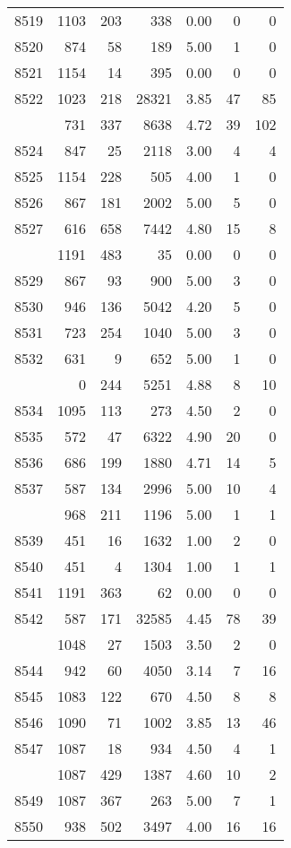 \documentclass[
]{article}
\begin{document}
\begin{table}
\begin{tabular}[t]{lrrrrrr}
8519 & 1103 & 203 & 338 & 0.00 & 0 & 0\\
8520 & 874 & 58 & 189 & 5.00 & 1 & 0\\
8521 & 1154 & 14 & 395 & 0.00 & 0 & 0\\
8522 & 1023 & 218 & 28321 & 3.85 & 47 & 85\\
\addlinespace
8523 & 731 & 337 & 8638 & 4.72 & 39 & 102\\
8524 & 847 & 25 & 2118 & 3.00 & 4 & 4\\
8525 & 1154 & 228 & 505 & 4.00 & 1 & 0\\
8526 & 867 & 181 & 2002 & 5.00 & 5 & 0\\
8527 & 616 & 658 & 7442 & 4.80 & 15 & 8\\
\addlinespace
8528 & 1191 & 483 & 35 & 0.00 & 0 & 0\\
8529 & 867 & 93 & 900 & 5.00 & 3 & 0\\
8530 & 946 & 136 & 5042 & 4.20 & 5 & 0\\
8531 & 723 & 254 & 1040 & 5.00 & 3 & 0\\
8532 & 631 & 9 & 652 & 5.00 & 1 & 0\\
\addlinespace
8533 & 0 & 244 & 5251 & 4.88 & 8 & 10\\
8534 & 1095 & 113 & 273 & 4.50 & 2 & 0\\
8535 & 572 & 47 & 6322 & 4.90 & 20 & 0\\
8536 & 686 & 199 & 1880 & 4.71 & 14 & 5\\
8537 & 587 & 134 & 2996 & 5.00 & 10 & 4\\
\addlinespace
8538 & 968 & 211 & 1196 & 5.00 & 1 & 1\\
8539 & 451 & 16 & 1632 & 1.00 & 2 & 0\\
8540 & 451 & 4 & 1304 & 1.00 & 1 & 1\\
8541 & 1191 & 363 & 62 & 0.00 & 0 & 0\\
8542 & 587 & 171 & 32585 & 4.45 & 78 & 39\\
\addlinespace
8543 & 1048 & 27 & 1503 & 3.50 & 2 & 0\\
8544 & 942 & 60 & 4050 & 3.14 & 7 & 16\\
8545 & 1083 & 122 & 670 & 4.50 & 8 & 8\\
8546 & 1090 & 71 & 1002 & 3.85 & 13 & 46\\
8547 & 1087 & 18 & 934 & 4.50 & 4 & 1\\
\addlinespace
8548 & 1087 & 429 & 1387 & 4.60 & 10 & 2\\
8549 & 1087 & 367 & 263 & 5.00 & 7 & 1\\
8550 & 938 & 502 & 3497 & 4.00 & 16 & 16\\

\end{tabular}
\end{table}
\end{document}
